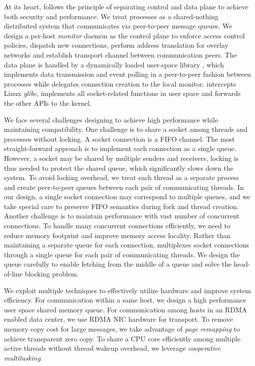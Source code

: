 At its heart, \sys{} follows the principle of separating control and data plane to achieve both security and performance. We treat processes as a shared-nothing distributed system that communicates via peer-to-peer message queues.
We design a per-host \emph{monitor} daemon as the control plane to enforce access control policies, dispatch new connections, perform address translation for overlay networks and establish transport channel between communication peers.
The data plane is handled by a dynamically loaded user-space library \libipc{}, which implements data transmission and event polling in a peer-to-peer fashion between processes while delegates connection creation to the local monitor.
\libipc{} intercepts Linux \emph{glibc}, implements all socket-related functions in user space and forwards the other APIs to the kernel.


We face several challenges designing \sys{} to achieve high performance while maintaining compatibility. 
One challenge is to share a socket among threads and processes without locking. A socket connection is a FIFO channel. 
The most straight-forward approach is to implement each connection as a single queue. However, a socket may be shared by multiple 
senders and receivers, locking is thus needed to protect the shared queue, which significantly slows down the system. To avoid locking overhead, we treat each thread as a separate process and create peer-to-peer queues between each pair of 
communicating threads. In our design, a single socket connection may correspond to multiple queues, and we take special care to preserve
FIFO semantics during fork and thread creation. Another challenge is to maintain performance with vast number of concurrent connections. 
To handle many concurrent connections efficiently, we need to reduce memory footprint and improve memory access locality. 
Rather than maintaining a separate queue for each connection, \sys multiplexes socket connections through a single queue for each pair of communicating threads.
We design the queue carefully to enable fetching from the middle of a queue and solve the head-of-line blocking problem. 

We exploit multiple techniques to effectively utilize hardware and improve system efficiency. 
For communication within a same host, we design a high performance user space shared memory queue.
For communication among hosts in an RDMA enabled data center, we use RDMA NIC hardware for transport. 
To remove memory copy cost for large messages, we take advantage of \emph{page remapping} to achieve transparent zero copy.
To share a CPU core efficiently among multiple active threads without thread wakeup overhead, we leverage \emph{cooperative multitasking}. 

